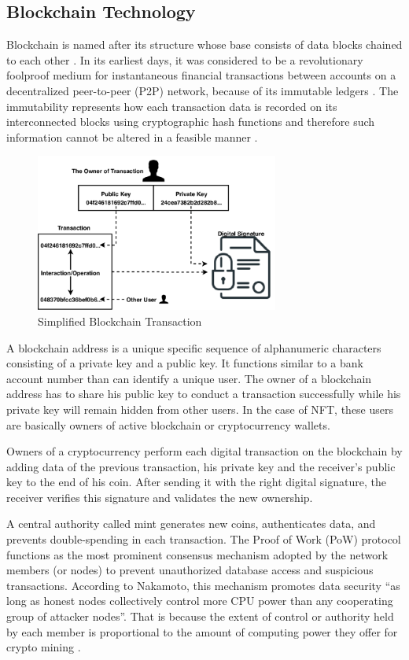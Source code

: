 \documentclass[12pt]{article}
\begin{document}
\subsection{Blockchain Technology}
Blockchain is named after its structure whose base consists of data blocks chained to each other \cite{ali2021introduction}. In its earliest days, it was considered to be a revolutionary foolproof medium for instantaneous financial transactions between accounts on a decentralized peer-to-peer (P2P) network, because of its immutable ledgers \cite{abid2021uses}. The immutability represents how each transaction data is recorded on its interconnected blocks using cryptographic hash functions and therefore such information cannot be altered in a feasible manner \cite{rahardja2021immutability}. 

\begin{figure}
    \centering
    \includegraphics[width=8cm]{Simplified-scheme-of-a-blockchain-transaction.png}
    \caption{Simplified Blockchain Transaction \cite{aydar2019private}}
    \label{fig:block}
\end{figure}

A blockchain address is a unique specific sequence of alphanumeric characters consisting of a private key and a public key. It functions similar to a bank account number than can identify a unique user. The owner of a blockchain address has to share his public key to conduct a transaction successfully while his private key will remain hidden from other users. In the case of NFT, these users are basically owners of active blockchain or cryptocurrency wallets.

Owners of a cryptocurrency perform each digital transaction on the blockchain by adding data of the previous transaction, his private key and the receiver’s public key to the end of his coin. After sending it with the right digital signature, the receiver verifies this signature and validates the new ownership. 

A central authority called mint generates new coins, authenticates data, and prevents double-spending in each transaction. The Proof of Work (PoW) protocol \cite{xiao2020modeling} functions as the most prominent consensus mechanism adopted by the network members (or nodes) to prevent unauthorized database access and suspicious transactions. According to Nakamoto, this mechanism promotes data security “as long as honest nodes collectively control more CPU power than any cooperating group of attacker nodes”. That is because the extent of control or authority held by each member is proportional to the amount of computing power they offer for crypto mining \cite{xiao2020modeling}.
\end{document}
